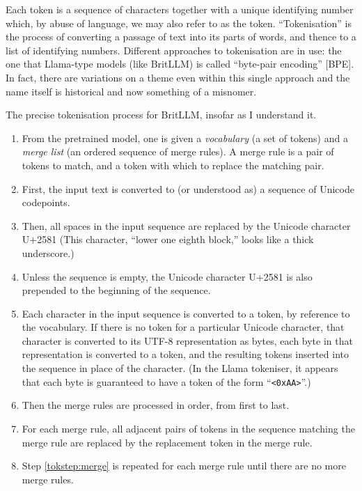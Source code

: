 \documentclass[11pt, a4paper]{article}
\begin{document}
Each token is a sequence of characters together with a unique
identifying number which, by abuse of language, we may also refer to
as the token. ``Tokenisation'' is the process of converting a passage
of text into its parts of words, and thence to a list of identifying
numbers. Different approaches to tokenisation are in use: the one that
Llama-type models (like BritLLM) is called ``byte-pair encoding''
[BPE]. In fact, there are variations on a theme even within this
single approach and the name itself is historical and now something of
a misnomer.
\begin{marginfigure}
  \footnotesize
  \caption{The precise tokenisation process for BritLLM, insofar as I
    understand it.\label{fig:toksteps}}
  \begin{enumerate}
  \item From the pretrained model, one is given a \emph{vocabulary} (a
    set of tokens) and a \emph{merge list} (an ordered sequence of
    merge rules). A merge rule is a pair of tokens to match, and a
    token with which to replace the matching pair.
  \item First, the input text is converted to (or understood as) a
    sequence of Unicode codepoints.
  \item Then, all spaces in the input sequence are replaced by the
    Unicode character U+2581 (This character, ``lower one eighth
    block,'' looks like a thick underscore.)\label{tokstep:replace}
  \item Unless the sequence is empty, the Unicode character U+2581 is
    also prepended to the beginning of the sequence.
  \item Each character in the input sequence is converted to a token,
    by reference to the vocabulary. If there is no token for a
    particular Unicode character, that character is converted to its
    UTF-8 representation as bytes, each byte in that representation is
    converted to a token, and the resulting tokens inserted into the
    sequence in place of the character. (In the Llama tokeniser, it
    appears that each byte is guaranteed to have a token of the form
    ``\texttt{<0xAA>}''.)
  \item Then the merge rules are processed in order, from first to
    last.
  \item For each merge rule, all adjacent pairs of tokens in the
    sequence matching the merge rule are replaced by the replacement
    token in the merge rule.\label{tokstep:merge}
  \item Step \ref{tokstep:merge} is repeated for each merge rule until
    there are no more merge rules.
  \end{enumerate}
\end{marginfigure}
\end{document}
